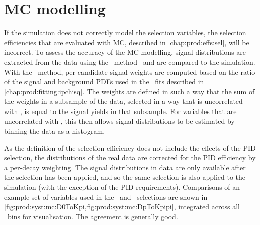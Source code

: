 \section{\acl{MC} modelling}
\label{chap:prod:syst:mc}

If the simulation does not correctly model the selection variables, the
selection efficiencies that are evaluated with \ac{MC}, described in
\cref{chap:prod:effs:sel}, will be incorrect.
To assess the accuracy of the \acl{MC} modelling, signal distributions are
extracted from the data using the \sPlot\ method~\cite{Pivk:2004ty} and are
compared to the simulation.
With the \sPlot\ method, per-candidate signal weights are computed based on the 
ratio of the signal and background \acp{PDF} used in the \lnipchisq\ fits 
described in \cref{chap:prod:fitting:ipchisq}.
The weights are defined in such a way that the sum of the weights in a 
subsample of the data, selected in a way that is uncorrelated with \lnipchisq, 
is equal to the signal yields in that subsample.
For variables that are uncorrelated with \lnipchisq, this then allows signal 
distributions to be estimated by binning the data as a histogram.

As the definition of the selection efficiency does not include the effects of
the \ac{PID} selection, the distributions of the real data are corrected for
the \ac{PID} efficiency by a per-decay weighting.
The signal distributions in data are only available after the selection has
been applied, and so the same selection is also applied to the simulation (with
the exception of the \ac{PID} requirements).
Comparisons of an example set of variables used in the \DzToKpi\ and
\DpToKpipi\ selections are shown in
\cref{fig:prod:syst:mc:D0ToKpi,fig:prod:syst:mc:DpToKpipi}, integrated across
all \pTy\ bins for visualisation.
The agreement is generally good.

